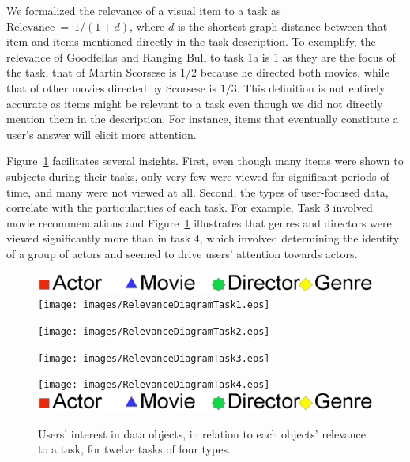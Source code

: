 We formalized the relevance of a visual item to a task as $\text{Relevance}~=~1/(1+d)$, where $d$  is the shortest graph distance between that item and items mentioned directly in the task description.  To exemplify, the relevance of Goodfellas and Ranging Bull to task 1a is $1$ as they are the focus of the task, that of Martin Scorsese is $1/2$  because he directed both movies, while that of other movies directed by Scorsese is $1/3$. This definition is not entirely accurate as items might be relevant to a task even though we did not directly mention them in the description.  For instance, items that eventually constitute a user's answer will elicit more attention. 

Figure~\ref{fig:RelevanceDiagram} facilitates several insights. First, even though many items were shown to subjects during their tasks, only very few were viewed for significant periods of time, and many were not viewed at all. Second, the types of user-focused data, correlate with the particularities of each task. For example, Task 3 involved movie recommendations and Figure~\ref{fig:RelevanceDiagram} illustrates that genres and directors were viewed significantly more than in task 4, which involved determining the identity of a group of actors and seemed to drive users' attention towards actors. 

\begin{figure}[!htb]
  \centering
	\includegraphics[width=0.45\linewidth]{images/Legends.eps}
  \texttt{[image: images/RelevanceDiagramTask1.eps]}
	
	\texttt{[image: images/RelevanceDiagramTask2.eps]}
	
	\texttt{[image: images/RelevanceDiagramTask3.eps]}
	
	\texttt{[image: images/RelevanceDiagramTask4.eps]}
	\includegraphics[width=0.45\linewidth]{images/Legends.eps}
	
  \caption{Users' interest in data objects, in relation to each objects' relevance to a task, for twelve tasks of four types. }
	\label{fig:RelevanceDiagram}
\end{figure}



